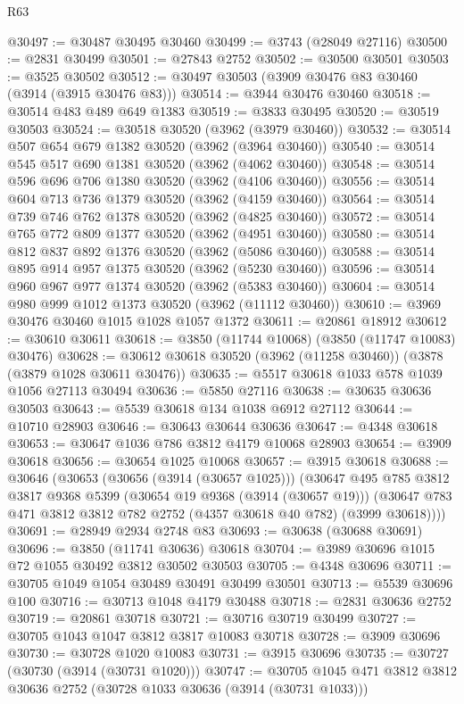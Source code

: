 \begin{lexlean}{R63}
\begin{coremodule}
@30497 := @30487 @30495 @30460
@30499 := @3743 (@28049 @27116)
@30500 := @2831 @30499
@30501 := @27843 @2752
@30502 := @30500 @30501
@30503 := @3525 @30502
@30512 := @30497 @30503 (@3909 @30476 @83 @30460 (@3914 (@3915 @30476 @83)))
@30514 := @3944 @30476 @30460
@30518 := @30514 @483 @489 @649 @1383
@30519 := @3833 @30495
@30520 := @30519 @30503
@30524 := @30518 @30520 (@3962 (@3979 @30460))
@30532 := @30514 @507 @654 @679 @1382 @30520 (@3962 (@3964 @30460))
@30540 := @30514 @545 @517 @690 @1381 @30520 (@3962 (@4062 @30460))
@30548 := @30514 @596 @696 @706 @1380 @30520 (@3962 (@4106 @30460))
@30556 := @30514 @604 @713 @736 @1379 @30520 (@3962 (@4159 @30460))
@30564 := @30514 @739 @746 @762 @1378 @30520 (@3962 (@4825 @30460))
@30572 := @30514 @765 @772 @809 @1377 @30520 (@3962 (@4951 @30460))
@30580 := @30514 @812 @837 @892 @1376 @30520 (@3962 (@5086 @30460))
@30588 := @30514 @895 @914 @957 @1375 @30520 (@3962 (@5230 @30460))
@30596 := @30514 @960 @967 @977 @1374 @30520 (@3962 (@5383 @30460))
@30604 := @30514 @980 @999 @1012 @1373 @30520 (@3962 (@11112 @30460))
@30610 := @3969 @30476 @30460 @1015 @1028 @1057 @1372
@30611 := @20861 @18912
@30612 := @30610 @30611
@30618 := @3850 (@11744 @10068) (@3850 (@11747 @10083) @30476)
@30628 := @30612 @30618 @30520 (@3962 (@11258 @30460)) (@3878 (@3879 @1028 @30611 @30476))
@30635 := @5517 @30618 @1033 @578 @1039 @1056 @27113 @30494
@30636 := @5850 @27116
@30638 := @30635 @30636 @30503
@30643 := @5539 @30618 @134 @1038 @6912 @27112
@30644 := @10710 @28903
@30646 := @30643 @30644 @30636
@30647 := @4348 @30618
@30653 := @30647 @1036 @786 @3812 @4179 @10068 @28903
@30654 := @3909 @30618
@30656 := @30654 @1025 @10068
@30657 := @3915 @30618
@30688 := @30646
    (@30653
      (@30656 (@3914 (@30657 @1025)))
      (@30647
        @495
        @785
        @3812
        @3817
        @9368
        @5399
        (@30654 @19 @9368 (@3914 (@30657 @19)))
        (@30647 @783 @471 @3812 @3812 @782 @2752 (@4357 @30618 @40 @782) (@3999 @30618))))
@30691 := @28949 @2934 @2748 @83
@30693 := @30638 (@30688 @30691)
@30696 := @3850 (@11741 @30636) @30618
@30704 := @3989 @30696 @1015 @72 @1055 @30492 @3812 @30502 @30503
@30705 := @4348 @30696
@30711 := @30705 @1049 @1054 @30489 @30491 @30499 @30501
@30713 := @5539 @30696 @100
@30716 := @30713 @1048 @4179 @30488
@30718 := @2831 @30636 @2752
@30719 := @20861 @30718
@30721 := @30716 @30719 @30499
@30727 := @30705 @1043 @1047 @3812 @3817 @10083 @30718
@30728 := @3909 @30696
@30730 := @30728 @1020 @10083
@30731 := @3915 @30696
@30735 := @30727 (@30730 (@3914 (@30731 @1020)))
@30747 := @30705 @1045 @471 @3812 @3812 @30636 @2752 (@30728 @1033 @30636 (@3914 (@30731 @1033)))

\end{coremodule}
\end{lexlean}
